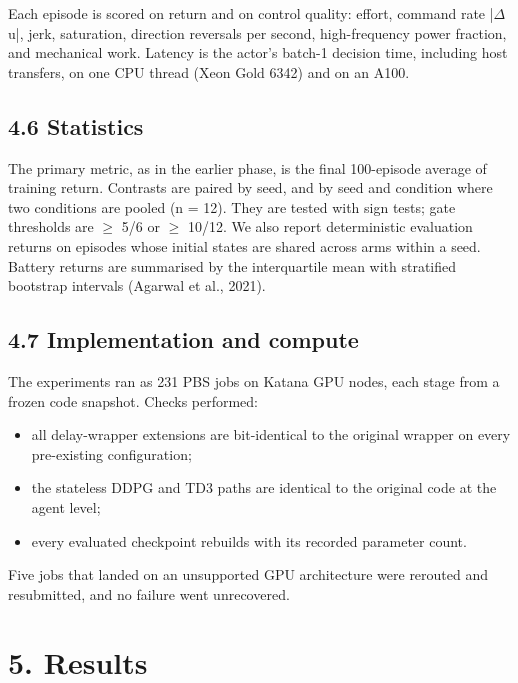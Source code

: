 \documentclass[11pt]{article}
\begin{document}
Each episode is scored on return and on control quality: effort, command rate |$\Delta$u|, jerk, saturation, direction reversals per second, high-frequency power fraction, and mechanical work. Latency is the actor's batch-1 decision time, including host transfers, on one CPU thread (Xeon Gold 6342) and on an A100.



\subsection*{4.6 Statistics}



The primary metric, as in the earlier phase, is the final 100-episode average of training return. Contrasts are paired by seed, and by seed and condition where two conditions are pooled (n = 12). They are tested with sign tests; gate thresholds are $\geq$ 5/6 or $\geq$ 10/12. We also report deterministic evaluation returns on episodes whose initial states are shared across arms within a seed. Battery returns are summarised by the interquartile mean with stratified bootstrap intervals (Agarwal et al., 2021).



\subsection*{4.7 Implementation and compute}



The experiments ran as 231 PBS jobs on Katana GPU nodes, each stage from a frozen code snapshot. Checks performed:

\begin{itemize}
\item all delay-wrapper extensions are bit-identical to the original wrapper on every pre-existing configuration;
\item the stateless DDPG and TD3 paths are identical to the original code at the agent level;
\item every evaluated checkpoint rebuilds with its recorded parameter count.
\end{itemize}



Five jobs that landed on an unsupported GPU architecture were rerouted and resubmitted, and no failure went unrecovered.



\section*{5. Results}
\end{document}
